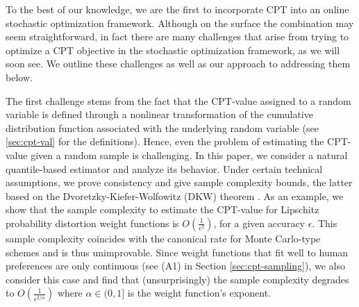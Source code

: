 To the  best of our knowledge, we are the first to incorporate CPT into an online stochastic optimization framework. Although on the surface the combination may seem straightforward, in fact there are many challenges that arise from trying to optimize a CPT objective in the stochastic optimization framework, as we will soon see. 
We outline these challenges as well as our approach to addressing them below.  

The first challenge stems from the fact that the CPT-value assigned to a random variable is defined through a nonlinear transformation of the cumulative distribution function associated with the underlying random variable (see \cref{sec:cpt-val} for the definitions). 
Hence, even the problem of estimating the CPT-value given a random sample is challenging.
In this paper, we consider a natural quantile-based estimator and analyze its behavior.
Under certain technical assumptions, we prove consistency and give sample complexity bounds, the latter based on the
 Dvoretzky-Kiefer-Wolfowitz (DKW) theorem \cite[Chapter 2]{wasserman2006}.
As an example, we show that the sample complexity to estimate the CPT-value 
for Lipschitz probability distortion weight functions is  $O\left(\frac1{\epsilon^2}\right)$, for a given accuracy $\epsilon$. This sample complexity coincides with the canonical rate for Monte Carlo-type schemes and is thus unimprovable. Since weight functions that fit well to human preferences are only  \holder continuous (see (A1) in Section \ref{sec:cpt-sampling}), we also consider this case and find that (unsurprisingly) the sample complexity  degrades to $O\left(\frac1{\epsilon^{2/\alpha}}\right)$ where $\alpha\in (0,1]$ is the weight function's \holder exponent.

